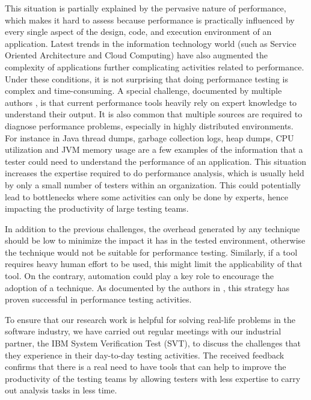 \documentclass[runningheads,a4paper]{llncs}
\begin{document}
This situation is partially explained by the pervasive nature of
performance, which makes it hard to assess because performance is practically
influenced by every single aspect of the design, code, and execution environment
of an application. Latest trends in the information technology world (such as
Service Oriented Architecture and Cloud Computing) have also augmented the
complexity of applications further complicating activities related to
performance. Under these conditions, it is not surprising that doing performance
testing is complex and time-consuming. A special challenge, documented by
multiple authors \cite{Woodside2007,trevor1,Angelopoulos2012}, is that current
performance tools heavily rely on expert knowledge to understand their output.
It is also common that multiple sources are required to diagnose
performance problems, especially in highly distributed environments. For
instance in Java thread dumps, garbage collection logs, heap dumps, CPU
utilization and JVM memory usage are a few examples of the information that a
tester could need to understand the performance of an application. This
situation increases the expertise required to do performance analysis, which is
usually held by only a small number of testers within an organization. This
could potentially lead to bottlenecks where some activities can only be done by
experts, hence impacting the productivity of large testing teams.

In addition to the previous challenges, the overhead generated by any technique
should be low to minimize the impact it has in the tested environment, otherwise
the technique would not be suitable for performance testing. Similarly, if a
tool requires heavy human effort to be used, this might limit the applicability
of that tool. On the contrary, automation could play a key role to encourage the
adoption of a technique. As documented by the authors in \cite{Shahamiri1}, this
strategy has proven successful in performance testing activities.

To ensure that our research work is helpful for solving real-life problems in
the software industry, we have carried out regular meetings with our
industrial partner, the IBM System Verification Test (SVT), to discuss the
challenges that they experience in their day-to-day testing activities. The
received feedback confirms that there is a real need to have tools that can help
to improve the productivity of the testing teams by allowing testers with less
expertise to carry out analysis tasks in less time.
\end{document}
